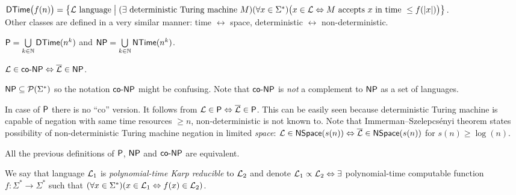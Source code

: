 		\begin{defn}\label{def:DTime}
			$\DTime\bigl(f(n)\bigr) = \bigl\{ {\cal L}\textnormal{ language} \bigm| (\exists \textnormal{ deterministic Turing machine }M)\\ (\forall x\in\Sigma^*)\bigl(x\in{\cal L} \iff M\textnormal{ accepts }x\textnormal{ in time }\leq f(|x|)\bigr) \bigr\}$.\\
			Other classes are defined in a very similar manner: time $\leftrightarrow$ space, deterministic $\leftrightarrow$ non-deterministic.
		\end{defn}
		
		\begin{defn}
			$\P = \bigcup\limits_{k\in\N} \DTime(n^k)$ and $\NP = \bigcup\limits_{k\in\N} \NTime(n^k)$.
		\end{defn}
		
		\begin{defn}
			$ {\cal L} \in \coNP \iff {\cal\overline L} \in \NP $.
		\end{defn}
		
		\begin{note}
			$\NP\subseteq\powerset{\Sigma^*}$ so the notation $\coNP$ might be confusing. Note that $\coNP$ is {\em not} a complement to $\NP$ as a set of languages.
		\end{note}
		
		\begin{remark}
			In case of $\P$ there is no ``co'' version. It follows from ${\cal L} \in \P \iff \overline{\cal L} \in \P$. This can be easily seen because deterministic Turing machine is capable of negation with same time resources $\geq n$, non-deterministic is not known to. Note that Immerman--Szelepcsényi theorem states possibility of non-deterministic Turing machine negation in limited {\em space}: ${\cal L} \in \NSpace(s(n)) \iff \overline{\cal L} \in \NSpace(s(n))$ for $s(n) \geq \log(n)$.
		\end{remark}
		
		\begin{thm}
			All the previous definitions of $\P$, $\NP$ and $\coNP$ are equivalent.
		\end{thm}
		
		\begin{defn}
			We say that language ${\cal L}_1$ is {\em polynomial-time Karp reducible} to ${\cal L}_2$ and denote ${\cal L}_1\propto{\cal L}_2 \iff \exists$ polynomial-time computable function $f:\Sigma^*\rightarrow\Sigma^*$ such that $(\forall x\in\Sigma^*)(x\in{\cal L}_1\iff f(x)\in{\cal L}_2)$.
		\end{defn}
		
